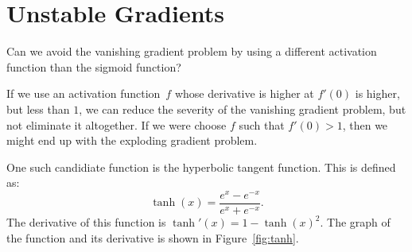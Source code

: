 \chapter{Unstable Gradients}

\begin{exercise}
Can we avoid the vanishing gradient problem by using a different activation function 
than the sigmoid function?
\end{exercise}
\begin{solution}
If we use an activation function~$f$ whose derivative is higher at $f'(0)$ is higher, but
less than $1$, we can reduce the severity of the vanishing gradient problem, but not eliminate 
it altogether. If we were choose $f$ such that $f'(0) > 1$, then we might end up with the 
exploding gradient problem. 

One such candidiate function is the hyperbolic tangent function. This is defined as:
\[
    \tanh (x) = \frac{e^x - e^{-x}}{e^x + e^{-x}}.
\]
The derivative of this function is $\tanh ' (x) = 1 - \tanh (x)^2$. The graph of the 
function and its derivative is shown in Figure~\ref{fig:tanh}.


\end{solution}
